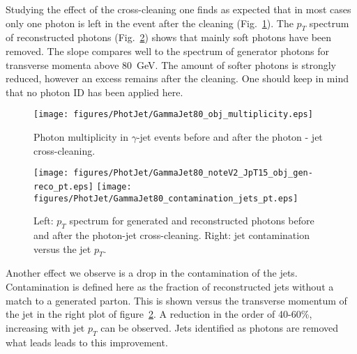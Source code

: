 \documentclass{cmspaper}
\begin{document}
Studying the effect of the cross-cleaning one finds as expected that in most
cases only one photon is left in the event after the cleaning
(Fig.~\ref{fig:pjPhotMult}). The $p_T$ spectrum of reconstructed photons
(Fig.~\ref{fig:pjPhotCont}) shows that mainly soft photons have been removed.
The slope compares well to the spectrum of generator photons for transverse
momenta above 80\ GeV. The amount of softer photons is strongly reduced,
however an excess remains after the cleaning. One should keep in mind that no
photon ID has been applied here.
\begin{figure}[hbtp]
  \begin{center}
    \texttt{[image: figures/PhotJet/GammaJet80\_obj\_multiplicity.eps]}
    \caption{Photon multiplicity in $\gamma$-jet events before and after the
    photon - jet cross-cleaning.}
    \label{fig:pjPhotMult}
  \end{center}
\end{figure}
\begin{figure}[hbtp]
  \begin{center}
    \texttt{[image: figures/PhotJet/GammaJet80\_noteV2\_JpT15\_obj\_gen-reco\_pt.eps]}
    \texttt{[image: figures/PhotJet/GammaJet80\_contamination\_jets\_pt.eps]}
    \caption{Left: $p_T$ spectrum for generated and reconstructed photons
    before and after the photon-jet cross-cleaning. Right: jet contamination
    versus the jet $p_T$.}
    \label{fig:pjPhotCont}
  \end{center}
\end{figure}

Another effect we observe is a drop in the contamination of the jets.
Contamination is defined here as the fraction of reconstructed jets without a
match to a generated parton. This is shown versus the transverse momentum of
the jet in the right plot of figure~\ref{fig:pjPhotCont}. A reduction in the
order of 40-60\%, increasing with jet $p_T$ can be observed. Jets identified as
photons are removed what leads leads to this improvement.
\end{document}

